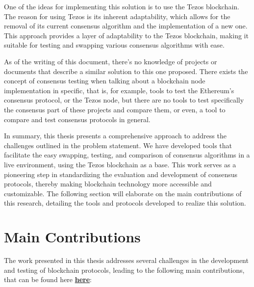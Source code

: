 One of the ideas for implementing this solution is to use the Tezos blockchain. The reason for using Tezos is its inherent adaptability, which allows for the removal of its current consensus algorithm and the implementation of a new one. This approach provides a layer of adaptability to the Tezos blockchain, making it suitable for testing and swapping various consensus algorithms with ease.

As of the writing of this document, there's no knowledge of projects or documents that describe a similar solution to this one proposed. There exists the concept of consensus testing when talking about a blockchain node implementation in specific, that is, for example, tools to test the Ethereum's consensus protocol, or the Tezos node, but there are no tools to test specifically the consensus part of these projects and compare them, or even, a tool to compare and test consensus protocols in general.


In summary, this thesis presents a comprehensive approach to address the challenges outlined in the problem statement. We have developed tools that facilitate the easy swapping, testing, and comparison of consensus algorithms in a live environment, using the Tezos blockchain as a base. This work serves as a pioneering step in standardizing the evaluation and development of consensus protocols, thereby making blockchain technology more accessible and customizable. The following section will elaborate on the main contributions of this research, detailing the tools and protocols developed to realize this solution.



\section{Main Contributions}


The work presented in this thesis addresses several challenges in the development and testing of blockchain protocols, leading to the following main contributions, that can be found here \href{https://gitlab.com/Gabulhas/tezos}{\textbf{here}}:

